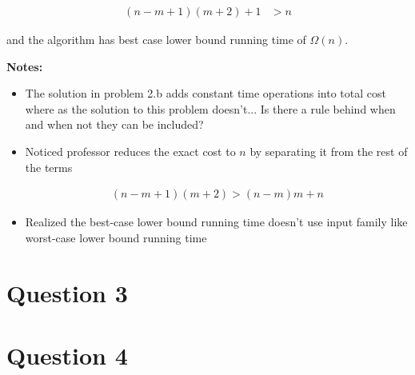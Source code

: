 \documentclass[12pt]{article}
\begin{document}
\begin{enumerate}[a.]
\begin{mdframed}
        \begin{align}
            (n-m+1)(m+2) + 1 &> n
        \end{align}

        and the algorithm has best case lower bound running time of $\Omega(n)$.
        \color{black}
    \end{mdframed}

    \bigskip

    \textbf{Notes:}

    \begin{itemize}
        \item The solution in problem 2.b adds constant time operations
        into total cost where as the solution to this problem doesn't... Is there
        a rule behind when and when not they can be included?

        \item Noticed professor reduces the exact cost to $n$ by separating it
        from the rest of the terms

        \begin{mdframed}
            \begin{align*}
                (n-m+1)(m+2) > (n-m)m + n
            \end{align*}
        \end{mdframed}

        \item Realized the best-case lower bound running time doesn't use input family
        like worst-case lower bound running time
    \end{itemize}

\end{enumerate}

\section*{Question 3}

\section*{Question 4}
\end{document}
